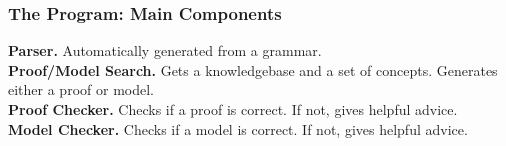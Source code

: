 \begin{frame}
  \frametitle{The Program: Main Components}
\textbf{Parser.} Automatically generated from a grammar. \\
\vspace{1cm}\pause
\textbf{Proof/Model Search.} Gets a knowledgebase and a set of concepts. Generates either
a proof or model. \\
\vspace{1cm}\pause
\textbf{Proof Checker.} Checks if a proof is correct. If not, gives helpful advice. \\
\vspace{1cm}\pause
\textbf{Model Checker.} Checks if a model is correct. If not, gives helpful advice. \\
\end{frame}
